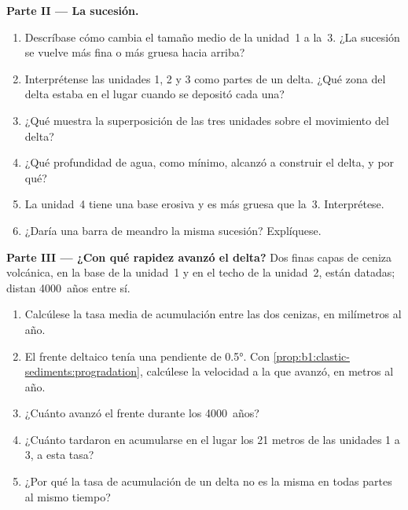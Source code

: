 \begin{problem}
\medskip
\noindent\textbf{Parte II --- La sucesión.}
\begin{enumerate}[resume]
  \item Descríbase cómo cambia el tamaño medio de la unidad~1 a la~3. ¿La sucesión se vuelve más fina o más gruesa hacia arriba?
  \item Interprétense las unidades 1, 2 y 3 como partes de un delta. ¿Qué zona del delta estaba en el lugar cuando se depositó cada una?
  \item ¿Qué muestra la superposición de las tres unidades sobre el movimiento del delta?
  \item ¿Qué profundidad de agua, como mínimo, alcanzó a construir el delta, y por qué?
  \item La unidad~4 tiene una base erosiva y es más gruesa que la~3. Interprétese.
  \item ¿Daría una barra de meandro la misma sucesión? Explíquese.
\end{enumerate}

\medskip
\noindent\textbf{Parte III --- ¿Con qué rapidez avanzó el delta?}
Dos finas capas de ceniza volcánica, en la base de la unidad~1 y en el techo de la unidad~2, están datadas; distan \num{4000}~años entre sí.
\begin{enumerate}[resume]
  \item Calcúlese la tasa media de acumulación entre las dos cenizas, en milímetros al año.
  \item El frente deltaico tenía una pendiente de \ang{0.5}. Con
        \cref{prop:b1:clastic-sediments:progradation}, calcúlese la velocidad a la que avanzó, en metros al año.
  \item ¿Cuánto avanzó el frente durante los \num{4000}~años?
  \item ¿Cuánto tardaron en acumularse en el lugar los 21 metros de las unidades 1 a 3, a esta tasa?
  \item ¿Por qué la tasa de acumulación de un delta no es la misma en todas partes al mismo tiempo?
\end{enumerate}


\end{problem}

